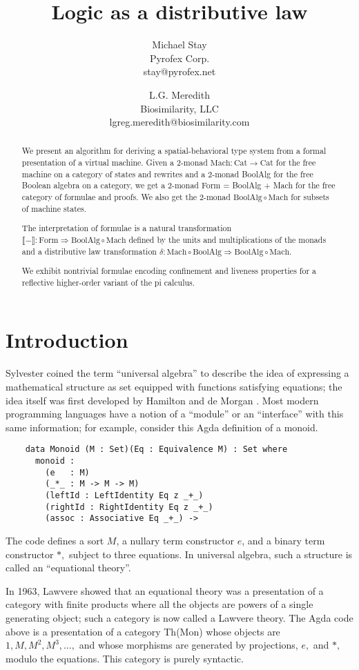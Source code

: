 \documentclass{article}
\title{Logic as a distributive law}
\author{
Michael Stay\\
  {Pyrofex Corp.}\\
  {\fontsize{8}{8}\selectfont stay@pyrofex.net}
\and
L.G. Meredith\\
  {Biosimilarity, LLC}\\
  {\fontsize{8}{8}\selectfont lgreg.meredith@biosimilarity.com}
}
\newcommand{\interp}[1]{\llbracket #1 \rrbracket}
\newcommand{\maps}{\colon}
\newcommand{\Cat}{\mathrm{Cat}}
\newcommand{\Mach}{\mathrm{Mach}}
\newcommand{\BoolAlg}{\mathrm{BoolAlg}}
\newcommand{\Form}{\mathrm{Form}}
\begin{document}
\maketitle
\begin{abstract}
\noindent
  We present an algorithm for deriving a spatial-behavioral type system from a formal presentation of a virtual machine.  Given a 2-monad $\Mach\maps \Cat \to \Cat$ for the free machine on a category of states and rewrites and a 2-monad BoolAlg for the free Boolean algebra on a category, we get a 2-monad Form = BoolAlg + Mach for the free category of formulae and proofs.  We also get the 2-monad $\BoolAlg \circ \Mach$ for subsets of machine states. 

  The interpretation of formulae is a natural transformation $\interp{-} \maps \Form \Rightarrow \BoolAlg \circ \Mach$ defined by the units and multiplications of the monads and a distributive law transformation $\delta\maps \Mach \circ \BoolAlg \Rightarrow \BoolAlg \circ \Mach.$

  We exhibit nontrivial formulae encoding confinement and liveness properties for a reflective higher-order variant of the pi calculus.

\end{abstract}
\section{Introduction}

  Sylvester coined the term ``universal algebra'' to describe the idea of expressing a mathematical structure as set equipped with functions satisfying equations; the idea itself was first developed by Hamilton and de Morgan \cite{Whitehead}.  Most modern programming languages have a notion of a ``module'' or an ``interface'' with this same information; for example, consider this Agda definition of a monoid.
  \begin{verbatim}
    data Monoid (M : Set)(Eq : Equivalence M) : Set where
      monoid :
        (e   : M)
        (_*_ : M -> M -> M)
        (leftId : LeftIdentity Eq z _+_)
        (rightId : RightIdentity Eq z _+_)
        (assoc : Associative Eq _+_) ->
  \end{verbatim}
  The code defines a sort $M$, a nullary term constructor $e$, and a binary term constructor $*,$ subject to three equations.  In universal algebra, such a structure is called an ``equational theory''.

  In 1963, Lawvere \cite{Lawvere} showed that an equational theory was a presentation of a category with finite products where all the objects are powers of a single generating object; such a category is now called a Lawvere theory.  The Agda code above is a presentation of a category Th(Mon) whose objects are $1, M, M^2, M^3, \ldots,$ and whose morphisms are generated by projections, $e,$ and $*,$ modulo the equations.  This category is purely syntactic.
\end{document}
